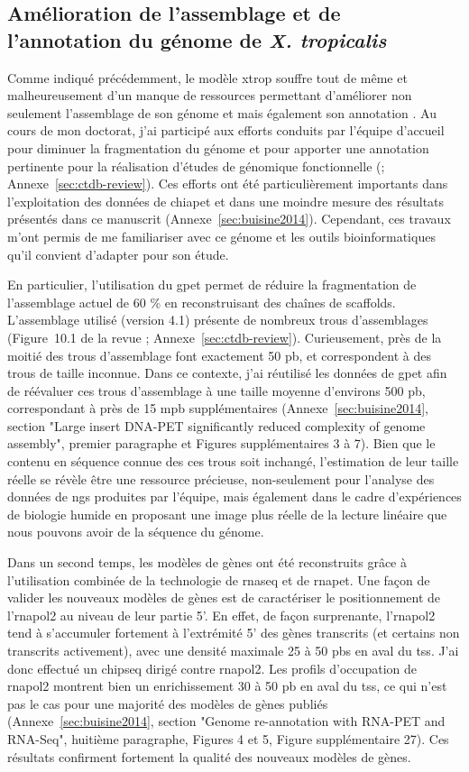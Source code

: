 \documentclass[../main.tex]{subfiles}
\begin{document}
\subsection{Amélioration de l'assemblage et de l'annotation du génome de \textit{X. tropicalis}}
Comme indiqué précédemment, le modèle \gls{xtrop} souffre tout de même et malheureusement d'un manque de ressources permettant d'améliorer non seulement l'assemblage de son génome et mais également son annotation \citep{Gilchrist2012}.
Au cours de mon doctorat, j'ai participé aux efforts conduits par l'équipe d'accueil pour diminuer la fragmentation du génome et pour apporter une annotation pertinente pour la réalisation d'études de génomique fonctionnelle (\citealp{Grimaldi2013}; Annexe~\ref{sec:ctdb-review}).
Ces efforts ont été particulièrement importants dans l'exploitation des données de \gls{chiapet} et dans une moindre mesure des résultats présentés dans ce manuscrit (Annexe~\ref{sec:buisine2014}).
Cependant, ces travaux m'ont permis de me familiariser avec ce génome et les outils bioinformatiques qu'il convient d'adapter pour son étude.
\par
En particulier, l'utilisation du \gls{gpet} permet de réduire la fragmentation de l'assemblage actuel de 60 \% en reconstruisant des chaînes de scaffolds.
L'assemblage utilisé (version 4.1) présente de nombreux trous d'assemblages (Figure~10.1 de la revue \citealp{Grimaldi2013}; Annexe~\ref{sec:ctdb-review}).
Curieusement, près de la moitié des trous d'assemblage font exactement 50 \gls{pb}, et correspondent à des trous de taille inconnue.
Dans ce contexte, j'ai réutilisé les données de \gls{gpet} afin de réévaluer ces trous d'assemblage à une taille moyenne d'environs 500 \gls{pb}, correspondant à près de 15 \gls{mpb} supplémentaires (Annexe~\ref{sec:buisine2014}, section "Large insert DNA-PET significantly reduced complexity of genome assembly", premier paragraphe et Figures supplémentaires 3 à 7).
Bien que le contenu en séquence connue des ces trous soit inchangé, l'estimation de leur taille réelle se révèle être une ressource précieuse, non-seulement pour l'analyse des données de \gls{ngs} produites par l'équipe, mais également dans le cadre d'expériences de biologie humide en proposant une image plus réelle de la lecture linéaire que nous pouvons avoir de la séquence du génome.
\par
Dans un second temps, les modèles de gènes ont été reconstruits grâce à l'utilisation combinée de la technologie de \gls{rnaseq} et de \gls{rnapet}.
Une façon de valider les nouveaux modèles de gènes est de caractériser le positionnement de l'\gls{rnapol2} au niveau de leur partie 5'.
En effet, de façon surprenante, l'\gls{rnapol2} tend à s'accumuler fortement à l'extrémité 5' des gènes transcrits (et certains non transcrits activement), avec une densité maximale 25 à 50 \glspl{pb} en aval du \gls{tss}.
J'ai donc effectué un \gls{chipseq} dirigé contre \gls{rnapol2}.
Les profils d'occupation de \gls{rnapol2} montrent bien un enrichissement 30 à 50 \gls{pb} en aval du \gls{tss}, ce qui n'est pas le cas pour une majorité des modèles de gènes publiés (Annexe~\ref{sec:buisine2014}, section "Genome re-annotation with RNA-PET and RNA-Seq", huitième paragraphe, Figures 4 et 5, Figure supplémentaire 27).
Ces résultats confirment fortement la qualité des nouveaux modèles de gènes.
\end{document}
